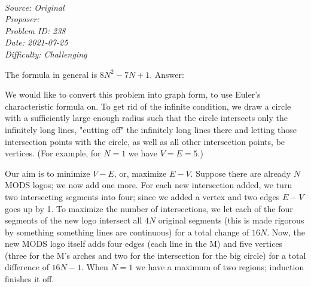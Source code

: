 \SSbreak\\
\emph{Source: Original}\\
\emph{Proposer: \Pmatt}\\ %
\emph{Problem ID: 238}\\
\emph{Date: 2021-07-25}\\
\emph{Difficulty: Challenging}\\
\SSbreak

\bigskip

\begin{solution}\hfil\medskip
  
    The formula in general is $8N^2 - 7N + 1$. Answer:  \medskip

    We would like to convert this problem into graph form, to use Euler's characteristic formula on. 
    To get rid of the infinite condition, we draw a circle with a sufficiently large enough radius 
    such that the circle intersects only the infinitely long lines, "cutting off" the infinitely 
    long lines there and letting those intersection points with the circle, as well as all other 
    intersection points, be vertices. (For example, for $N = 1$ we have $V = E = 5$.) \medskip

    Our aim is to minimize $V - E$, or, maximize $E - V$. Suppose there are already $N$ MODS 
    logos; we now add one more. For each new intersection added, we turn two intersecting segments 
    into four; since we added a vertex and two edges $E - V$ goes up by 1. To maximize the number of 
    intersections, we let each of the four segments of the new logo intersect all $4N$ original 
    segments (this is made rigorous by something something lines are continuous) for a total change of 
    $16N$. Now, the new MODS logo itself adds four edges (each line in the M) and five vertices 
    (three for the M's arches and two for the intersection for the big circle) for a total 
    difference of $16N - 1$. When $N = 1$ we have a maximum of two regions; induction finishes it off. 
\end{solution}\bigskip
